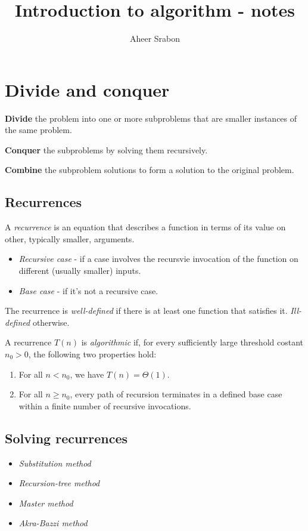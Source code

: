 

\title{Introduction to algorithm - notes}
\author{Aheer Srabon}
\date{}


\maketitle

\section{Divide and conquer}
\noindent \textbf{Divide} the problem into one or more subproblems that are smaller instances
of the same problem.

\noindent \textbf{Conquer} the subproblems by solving them recursively.

\noindent \textbf{Combine} the subproblem solutions to form a solution to the
original problem.

\subsection{Recurrences}
\noindent A \emph{recurrence} is an equation that describes a function in terms of its
value on other, typically smaller, arguments. 
\begin{itemize}
	\item \emph{Recursive case} - if a case involves the recursvie invocation of the
		function on different (usually smaller) inputs.
	\item \emph{Base case} - if it's not a recursive case.
\end{itemize} 

\noindent The recurrence is \emph{well-defined} if there is at least one function that 
satisfies it. \emph{Ill-defined} otherwise.

\noindent A recurrence $ T(n) $ is \emph{algorithmic} if, for every sufficiently large
threshold costant $ n_0 > 0 $, the following two properties hold:
\begin{enumerate}
	\item For all $ n < n_0 $, we have $ T(n) = \Theta (1) $.
	\item For all $ n \geq n_0 $, every path of recursion terminates in a defined base
		case within a finite number of recursive invocations.
\end{enumerate}

\subsection{Solving recurrences}
\begin{itemize}
	\item \emph{Substitution method}
	\item \emph{Recursion-tree method}
	\item \emph{Master method}
	\item \emph{Akra-Bazzi method}
\end{itemize}


